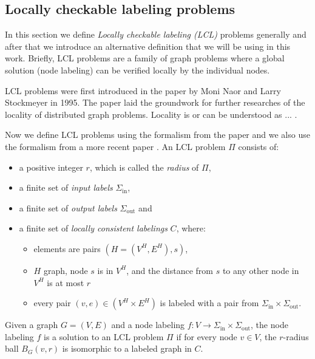
\subsection{Locally checkable labeling problems} \label{sec:lcl_problems}
In this section we define \emph{Locally checkable labeling (LCL)} problems generally and after that we introduce an alternative definition that we will be using in this work.
Briefly, LCL problems are a family of graph problems where a global solution (node labeling) can be verified locally by the individual nodes.

LCL problems were first introduced in the paper \cite{DBLP:journals/siamcomp/NaorS95} by Moni Naor and Larry Stockmeyer in 1995.
The paper laid the groundwork for further researches of the locality of distributed graph problems.
Locality is or can be understood as ...
.

\newcommand{\Sigmain}{\Sigma_{\text{in}}}
\newcommand{\Sigmaout}{\Sigma_{\text{out}}}


Now we define LCL problems using the formalism from the paper \cite{DBLP:journals/siamcomp/NaorS95} and we also use the formalism from a more recent paper \cite{DBLP:journals/corr/abs-2105-05574}.
An LCL problem $\Pi$ consists of:
\begin{itemize}
  \item a positive integer $r$, which is called the \emph{radius} of $\Pi$,
  \item a finite set of \emph{input labels} $\Sigmain$,
  \item a finite set of \emph{output labels} $\Sigmaout$ and
  \item a finite set of \emph{locally consistent labelings} $C$, where:
  \begin{itemize}
    \item elements are pairs $(H=(V^H, E^H), s)$,
    \item $H$ graph, node $s$ is in $V^H$, and the distance from $s$ to any other node in $V^H$ is at most $r$
    \item every pair $(v, e) \in (V^H \times E^H)$ is labeled with a pair from $\Sigmain \times \Sigmaout$.
  \end{itemize}
\end{itemize}
Given a graph $G = (V, E)$ and a node labeling $f: V \rightarrow \Sigmain \times \Sigmaout$, the node labeling $f$ is a solution to an LCL problem $\Pi$ if for every node $v \in V$, the $r$-radius ball $B_G(v, r)$ is isomorphic to a labeled graph in $C$.



